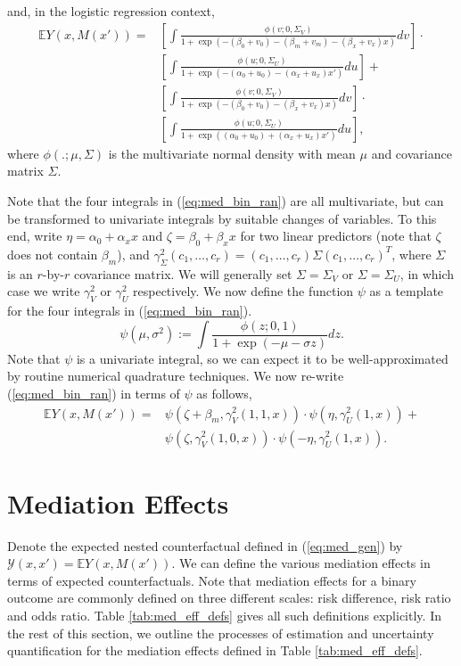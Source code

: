 \documentclass{report}
\newcommand{\bE}{\mathbb{E}}
\newcommand{\sY}{\mathcal{Y}}
\begin{document}
%
and, in the logistic regression context,
%
\begin{align}
    \bE Y(x, M(x')) =& \left[ \int \frac{\phi(v; 0, \Sigma_V)}{1 + \exp(-(\beta_0 + v_0) - (\beta_m + v_m) - (\beta_x + v_x) x)}  dv \right] \cdot \label{eq:med_bin_ran}\\
    &\left[ \int \frac{\phi(u; 0, \Sigma_U)}{1 + \exp(-(\alpha_0 + u_0) - (\alpha_x + u_x) x')}  du \right] + \nonumber\\
    & \left[\int \frac{\phi(v; 0, \Sigma_V)}{1 + \exp(-(\beta_0 + v_0) - (\beta_x + v_x) x)} dv \right] \cdot \nonumber\\
    & \left[\int \frac{\phi(u; 0, \Sigma_U)}{1 + \exp((\alpha_0 + u_0) + (\alpha_x + u_x) x')} du \right], \nonumber
\end{align}
%
where $\phi(.; \mu, \Sigma)$ is the multivariate normal density with mean $\mu$ and covariance matrix $\Sigma$. 

Note that the four integrals in (\ref{eq:med_bin_ran}) are all multivariate, but can be transformed to univariate integrals by suitable changes of variables. To this end, write $\eta = \alpha_0 + \alpha_x x$ and $\zeta = \beta_0 + \beta_x x$ for two linear predictors (note that $\zeta$ does not contain $\beta_m$), and $\gamma^2_\Sigma(c_1, \ldots, c_r) = (c_1, \ldots, c_r) \Sigma (c_1, \ldots, c_r)^T$, where $\Sigma$ is an $r$-by-$r$ covariance matrix. We will generally set $\Sigma = \Sigma_V$ or $\Sigma = \Sigma_U$, in which case we write $\gamma^2_V$ or $\gamma^2_U$ respectively. We now define the function $\psi$ as a template for the four integrals in (\ref{eq:med_bin_ran}). 
%
$$
\psi(\mu, \sigma^2) := \int \frac{\phi(z; 0, 1)}{1 + \exp(-\mu - \sigma z)} dz.
$$
%
Note that $\psi$ is a univariate integral, so we can expect it to be well-approximated by routine numerical quadrature techniques. We now re-write (\ref{eq:med_bin_ran}) in terms of $\psi$ as follows,
%
\begin{align}
    \bE Y(x, M(x')) =& \psi(\zeta + \beta_m, \gamma^2_V(1, 1, x)) \cdot \psi(\eta, \gamma^2_U(1, x)) +\\
    & \psi(\zeta, \gamma^2_V(1, 0, x)) \cdot \psi(-\eta, \gamma^2_U(1, x)). \nonumber 
\end{align}


\section{Mediation Effects}
Denote the expected nested counterfactual defined in (\ref{eq:med_gen}) by $\sY(x, x') = \bE Y(x, M(x'))$. We can define the various mediation effects in terms of expected counterfactuals. Note that mediation effects for a binary outcome are commonly defined on three different scales: risk difference, risk ratio and odds ratio. Table \ref{tab:med_eff_defs} gives all such definitions explicitly. In the rest of this section, we outline the processes of estimation and uncertainty quantification for the mediation effects defined in Table \ref{tab:med_eff_defs}.
\end{document}
